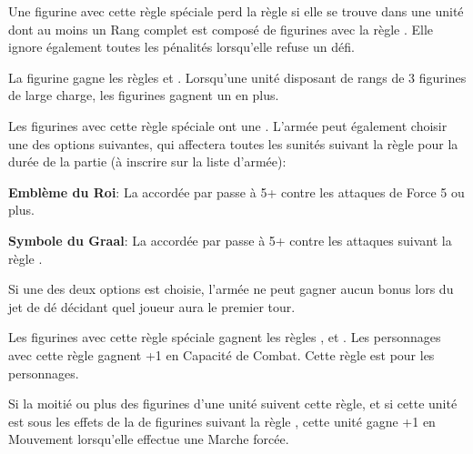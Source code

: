 

\startarmyspecialrules

\armyspecialruleentry{\beloved}

Une figurine avec cette règle spéciale perd la règle \firstinrank{} si elle se trouve dans une unité dont au moins un Rang complet est composé de figurines avec la règle \lanceformation{}. Elle ignore également toutes les pénalités lorsqu'elle refuse un défi.

\armyspecialruleentry{\lanceformation}

La figurine gagne les règles \monstrousrank{} et \fightinextrarank{}. Lorsqu'une unité disposant de rangs de 3 figurines de large charge, les figurines gagnent un \fightinextrarank{} en plus. 

\armyspecialruleentry{\theblessing}

Les figurines avec cette règle spéciale ont une . L'armée peut également choisir une des options suivantes, qui affectera toutes les sunités suivant la règle \theblessing{} pour la durée de la partie (à inscrire sur la liste d'armée):
\begin{customsubitemize}
\item \textbf{Emblème du Roi}: La \wardsave{} accordée par \theblessing{} passe à 5+ contre les attaques de Force 5 ou plus. 
\item \textbf{Symbole du Graal}: La \wardsave{} accordée par \theblessing{} passe à 5+ contre les attaques suivant la règle \armourpiercing{}.
\end{customsubitemize}\newline
 Si une des deux options est choisie, l'armée ne peut gagner aucun bonus lors du jet de dé décidant quel joueur aura le premier tour. 

\armyspecialruleentry{\grailoath}

Les figurines avec cette règle spéciale gagnent les règles \magicalattacks{}, \immunetopsychology{} et . Les personnages avec cette règle gagnent +1 en Capacité de Combat. Cette règle est \oneofakind{} pour les personnages.

\armyspecialruleentry{\serfs}

Si la moitié ou plus des figurines d'une unité suivent cette règle, et si cette unité est sous les effets de la \inspiringpresence{} de figurines suivant la règle \oathoffealty{}, cette unité gagne +1 en Mouvement lorsqu'elle effectue une Marche forcée.

\armyspecialruleentry{\oathoffealty}

